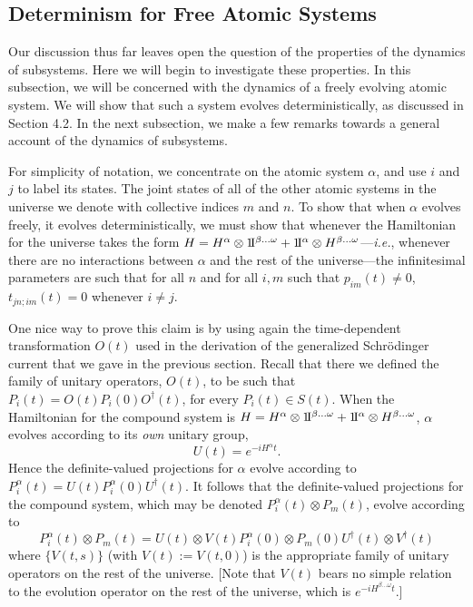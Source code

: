 \documentclass[12pt]{article}
\newcommand{\ie}{{\it i.e.}}         %
\newcommand{\ident}{1\!{\rm I}}                                 %
\newcommand{\ga}{\alpha}                                        %
\newcommand{\gb}{\beta}                                         %
\newcommand{\gw}{\omega}                                        %
\begin{document}
\subsection{Determinism for Free Atomic Systems}


Our discussion thus far leaves open the question of the properties of 
the dynamics of subsystems.  Here we will begin to investigate these 
properties.  In this subsection, we will be concerned with the 
dynamics of a freely evolving atomic system.  We will show that such a 
system evolves deterministically, as discussed in Section 4.2.  In the 
next subsection, we make a few remarks towards a general account of 
the dynamics of subsystems.

For simplicity of notation, we concentrate on the atomic system $\ga$, 
and use $i$ and $j$ to label its states.  The joint states of all of 
the other atomic systems in the universe we denote with collective 
indices $m$ and $n$.  To show that when $\ga$ evolves freely, it 
evolves deterministically, we must show that whenever the Hamiltonian 
for the universe takes the form $H = H^{\ga} \otimes 
\ident^{\gb\ldots\gw} + \ident^{\ga} \otimes H^{\gb\ldots\gw}$---\ie, 
whenever there are no interactions between $\ga$ and the rest of the 
universe---the infinitesimal parameters are such that for all $n$ and 
for all $i, m$ such that $p_{im}(t) \neq 0$, $t_{jn;im}(t) = 0$ 
whenever $i \neq j$.

One nice way to prove this claim is by using again the time-dependent 
transformation $O(t)$ used in the derivation of the generalized 
Schr\"odinger current that we gave in the previous section.  Recall 
that there we defined the family of unitary operators, $O(t)$, to be 
such that $P_{i}(t) = O(t) P_{i}(0) O^{\dagger}(t)$, for every 
$P_{i}(t) \in S(t)$.  When the Hamiltonian for the compound system is 
$H = H^{\ga} \otimes \ident^{\gb\ldots\gw} +
\ident^{\ga} \otimes H^{\gb \ldots \gw}$, $\ga$ evolves according to
its {\it own} unitary group,
\begin{equation}
  \label{eq:gaop}
  U(t) = e^{-iH^{\ga}t}.
\end{equation}
Hence the definite-valued projections for $\ga$ evolve according to 
$P^{\ga}_{i}(t) = U(t) P^{\ga}_{i}(0) U^{\dagger}(t)$.  It follows 
that the definite-valued projections for the compound system, which 
may be denoted $P^{\ga}_{i}(t) \otimes P_{m}(t)$, evolve according to
\begin{equation}
  \label{eq:compoundev}
  P^{\ga}_{i}(t) \otimes P_{m}(t) = U(t) \otimes V(t) P^{\ga}_{i}(0)
  \otimes P_{m}(0) U^{\dagger}(t) \otimes V^{\dagger}(t)
\end{equation}
where $\{V(t,s)\}$ (with $V(t):=V(t,0)$) is the appropriate family of 
unitary operators on the rest of the universe.  [Note that $V(t)$ 
bears no simple relation to the evolution operator on the rest of the 
universe, which is $e^{-iH^{\gb\ldots\gw}t}$.]
\end{document}
